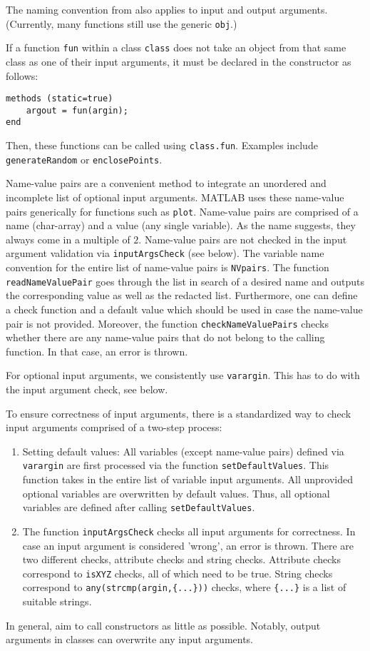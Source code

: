 
The naming convention from  also applies to input and output arguments.
(Currently, many functions still use the generic \verb|obj|.)

If a function \verb|fun| within a class \verb|class| does not take an object from that same class as one of their input arguments, it must be declared in the constructor as follows:
\begin{Verbatim}
methods (static=true)
	argout = fun(argin);
end
\end{Verbatim}
Then, these functions can be called using \verb|class.fun|.
Examples include \verb|generateRandom| or \verb|enclosePoints|.

\smallskip

Name-value pairs are a convenient method to integrate an unordered and incomplete list of optional input arguments.
MATLAB uses these name-value pairs generically for functions such as \verb|plot|.
Name-value pairs are comprised of a name (char-array) and a value (any single variable).
As the name suggests, they always come in a multiple of $2$.
Name-value pairs are not checked in the input argument validation via \verb|inputArgsCheck| (see below).
The variable name convention for the entire list of name-value pairs is \verb|NVpairs|.
The function \verb|readNameValuePair| goes through the list in search of a desired name and outputs the corresponding value as well as the redacted list.
Furthermore, one can define a check function and a default value which should be used in case the name-value pair is not provided.
Moreover, the function \verb|checkNameValuePairs| checks whether there are any name-value pairs that do not belong to the calling function.
In that case, an error is thrown.

\smallskip

For optional input arguments, we consistently use \verb|varargin|.
This has to do with the input argument check, see below.

\smallskip

To ensure correctness of input arguments, there is a standardized way to check input arguments comprised of a two-step process:
\begin{enumerate}
	\item Setting default values:
		All variables (except name-value pairs) defined via \verb|varargin| are first processed via the function \verb|setDefaultValues|.
		This function takes in the entire list of variable input arguments.
		All unprovided optional variables are overwritten by default values.
		Thus, all optional variables are defined after calling \verb|setDefaultValues|.
	\item The function \verb|inputArgsCheck| checks all input arguments for correctness.
	In case an input argument is considered 'wrong', an error is thrown.
	There are two different checks, attribute checks and string checks.
	Attribute checks correspond to \verb|isXYZ| checks, all of which need to be true.
	String checks correspond to \verb|any(strcmp(argin,{...}))| checks, where \verb|{...}| is a list of suitable strings.
\end{enumerate}

\smallskip

In general, aim to call constructors as little as possible.
Notably, output arguments in classes can overwrite any input arguments.
